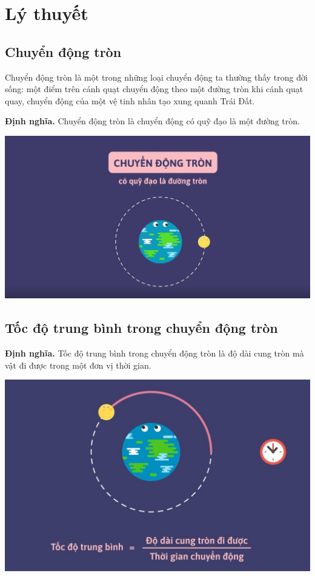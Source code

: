 \setcounter{section}{0}

\section{Lý thuyết}
\subsection{Chuyển động tròn}
Chuyển động tròn là một trong những loại chuyển động ta thường thấy trong đời sống: một điểm trên cánh quạt chuyển động theo một đường tròn khi cánh quạt quay, chuyển động của một vệ tinh nhân tạo xung quanh Trái Đất.

\textbf{Định nghĩa.} Chuyển động tròn là chuyển động có quỹ đạo là một đường tròn.
\begin{center}
	\includegraphics[scale=0.3]{../figs/VN10-PH-06-L-005-1-V2-01.jpg}
\end{center}
\subsection{Tốc độ trung bình trong chuyển động tròn}

\textbf{Định nghĩa.} Tốc độ trung bình trong chuyển động tròn là độ dài cung tròn mà vật đi được trong một đơn vị thời gian.
\begin{center}
	\includegraphics[scale=0.3]{../figs/VN10-PH-06-L-005-1-V2-02.jpg}
\end{center}
